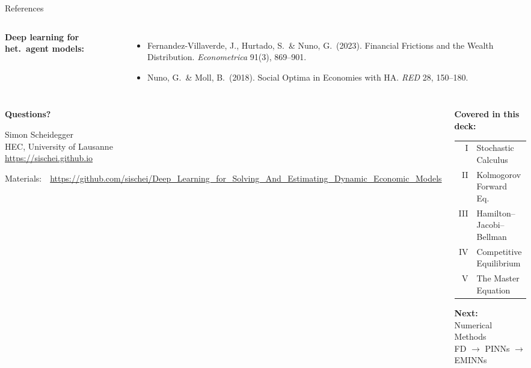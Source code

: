 \documentclass[aspectratio=169,11pt]{beamer}
\begin{document}
\begin{frame}{References}
\begin{columns}[T]
\vspace{0.3em}
\textbf{Deep learning for het.\ agent models:}
\begin{itemize}\itemsep1pt
    \item Fernandez-Villaverde, J., Hurtado, S.\ \& Nuno, G.\ (2023). Financial Frictions and the Wealth Distribution. \emph{Econometrica} 91(3), 869--901.
    \item Nuno, G.\ \& Moll, B.\ (2018). Social Optima in Economies with HA. \emph{RED} 28, 150--180.
\end{itemize}
\end{columns}
\end{frame}

\begin{frame}{}
\begin{columns}[c]
\begin{center}
{\Huge \textcolor{uzhblue}{\textbf{Questions?}}}

\vspace{1.0cm}
{\large Simon Scheidegger}\\[4pt]
{\small HEC, University of Lausanne}\\[4pt]
\url{https://sischei.github.io}

\vspace{0.6cm}
{\small Materials:~~\url{https://github.com/sischei/Deep_Learning_for_Solving_And_Estimating_Dynamic_Economic_Models}}
\end{center}

\begin{center}
\textbf{Covered in this deck:}\\[8pt]
{\small
\begin{tabular}{rl}
I & Stochastic Calculus \\
II & Kolmogorov Forward Eq. \\
III & Hamilton--Jacobi--Bellman \\
IV & Competitive Equilibrium \\
V & The Master Equation \\
\end{tabular}
}

\vspace{0.8cm}
\textbf{Next:}\\[6pt]
{\large Numerical Methods}\\
{\large FD $\to$ PINNs $\to$ EMINNs}\\[8pt]
\end{center}
\end{columns}
\end{frame}
\end{document}
